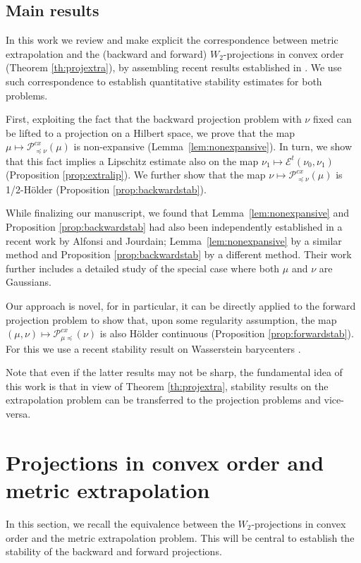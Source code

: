 \documentclass[12pt]{amsart}
\begin{document}
\subsection{Main results} In this work we review and make explicit the correspondence between metric extrapolation and the (backward and forward) $W_2$-projections in convex order (Theorem \ref{th:projextra}), by assembling recent results established in \cite{Gallouet2025,bourne2025semi,alfonsi2020sampling,gozlan2020mixture,kim2024backward}. We use such correspondence to establish quantitative stability estimates for both problems.

First, exploiting the fact that the backward projection problem with $\nu$ fixed can be lifted to a projection on a Hilbert space, we prove that the map $\mu \mapsto \mathscr{P}_{\preceq \nu}^{cx} (\mu)$ is non-expansive { (Lemma~\ref{lem:nonexpansive}).}
In turn, we show that this fact implies a Lipschitz estimate also on the map $\nu_1 \mapsto \mathscr{E}^t(\nu_0,\nu_1)$ (Proposition \ref{prop:extralip}). We further show that the map $\nu \mapsto \mathscr{P}_{\preceq \nu}^{cx} (\mu)$ is 1/2-H\"older (Proposition \ref{prop:backwardstab}).

 { While finalizing our manuscript, we found that Lemma~\ref{lem:nonexpansive} and Proposition \ref{prop:backwardstab}
 had also been independently established in a recent work \cite[Proposition 2.2, Proposition 2.9]{alfonsi2025wasserstein} by Alfonsi and Jourdain; Lemma~\ref{lem:nonexpansive} by a similar method and Proposition \ref{prop:backwardstab} by a different method.  Their work further includes a detailed study of the special case where both  $\mu$ and $\nu$ are Gaussians.}

{  Our approach is novel, for in particular, it}  can be directly applied to the forward projection problem to show that, upon some regularity assumption, { the map} $(\mu,\nu) \mapsto \mathscr{P}_{\mu \preceq }^{cx} (\nu)$ is also H\"older continuous (Proposition \ref{prop:forwardstab}). { For this we use a recent stability result on Wasserstein barycenters  \cite[Theorem 1.5]{carlier2024quantitative}.} 

Note that even if the latter results may not be sharp, the fundamental idea of this work is that in view of Theorem \ref{th:projextra}, stability results on the extrapolation problem can be transferred to the projection problems and vice-versa.

\section{Projections in convex order and metric extrapolation}
In this section, we recall the equivalence between the $W_2$-projections in convex order and the metric extrapolation problem. This will be central to establish the stability of the backward and forward projections.
\end{document}
